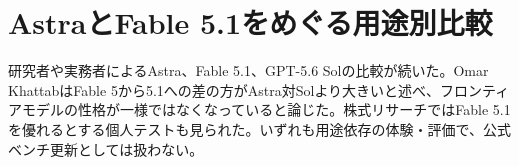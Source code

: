\section{AstraとFable 5.1をめぐる用途別比較}
研究者や実務者によるAstra、Fable 5.1、GPT-5.6 Solの比較が続いた。Omar KhattabはFable 5から5.1への差の方がAstra対Solより大きいと述べ、フロンティアモデルの性格が一様ではなくなっていると論じた。株式リサーチではFable 5.1を優れるとする個人テストも見られた。いずれも用途依存の体験・評価で、公式ベンチ更新としては扱わない。
